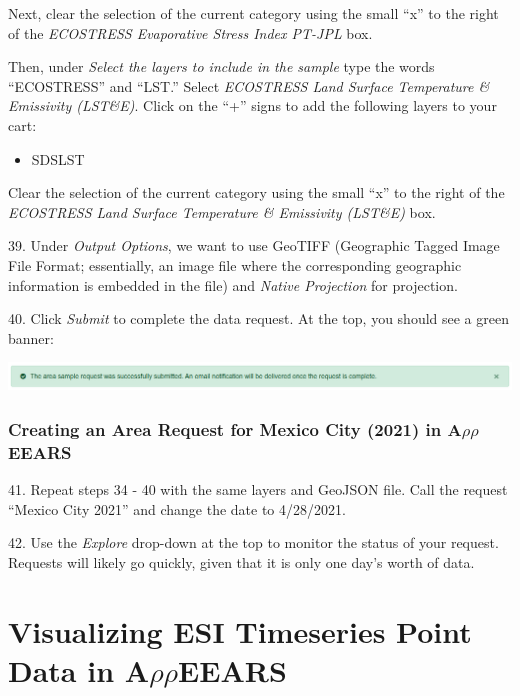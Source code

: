 \documentclass[oneside,a4paper,11pt,explicit]{book}
\begin{document}
Next, clear the selection of the current category using the small ``x'' to the right of the \textit{ECOSTRESS Evaporative Stress Index PT-JPL} box.

Then, under \textit{Select the layers to include in the sample} type the words ``ECOSTRESS'' and ``LST.'' Select \textit{ECOSTRESS Land Surface Temperature \& Emissivity (LST\&E)}. Click on the ``+'' signs to add the following layers to your cart: 

\begin{itemize}
	\item SDS\textunderscore LST
\end{itemize}

Clear the selection of the current category using the small ``x'' to the right of the \textit{ECOSTRESS Land Surface Temperature \& Emissivity (LST\&E)} box.

39. Under \textit{Output Options}, we want to use GeoTIFF (Geographic Tagged Image File Format; essentially, an image file where the corresponding geographic information is embedded in the file) and \textit{Native Projection} for projection.

40. Click \textit{Submit} to complete the data request. At the top, you should see a green banner:

\vspace{.5em}

\centerline{\includegraphics[width=\textwidth]{RequestSuccess.png}}

\subsubsection{Creating an Area Request for Mexico City (2021) in A$\rho\rho$EEARS}

41. Repeat steps 34 - 40 with the same layers and GeoJSON file. Call the request ``Mexico City 2021'' and change the date to 4/28/2021.

42. Use the \textit{Explore} drop-down at the top to monitor the status of your request. Requests will likely go quickly, given that it is only one day's worth of data.

\section{Visualizing ESI Timeseries Point Data in A$\rho\rho$EEARS}
\end{document}
